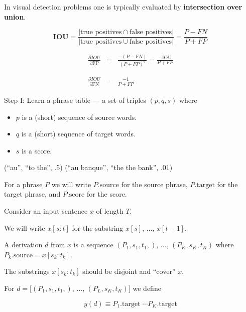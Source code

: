 {

In visual detection problems one is typically evaluated by {\bf intersection over union}.

$$\mathbf{IOU} = \frac{|\mbox{true positives} \cap \mbox{false positives}|}{|\mbox{true positives} \cup\mbox{false positives}|} = \frac{P - FN}{P + FP}$$

\vfill
\begin{eqnarray*}
    \frac{\partial \mathrm{}IOU}{\partial \mathrm{FP}} & =  & \frac{-(P - FN)}{(P + FP)^2} = \frac{-\mathrm{IOU}}{P+ FP} \\
    \\ \\
    \frac{\partial \mathrm{}IOU}{\partial \mathrm{FN}} & =  & \frac{-1}{P + FP}
\end{eqnarray*}


Step I:   Learn a phrase table --- a set of triples $(p,q,s)$ where

\vfill
\begin{itemize}
\item $p$ is a (short) sequence of source words.
  \vfill
\item $q$ is a (short) sequence of target words.
  \vfill
\item $s$ is a score.
\end{itemize}

\vfill
(``au'', ``to the'', .5) \hfill (``au banque'', ``the the bank'', .01)

\vfill
For a phrase $P$ we will write $P.\mathrm{source}$ for the source phrase, $P.\mathrm{target}$ for the target phrase, and $P.\mathrm{score}$ for the score.


Consider an input sentence $x$ of length $T$.

\vfill
We will write $x[s:t]$ for the substring $x[s]$, $\ldots$, $x[t-1]$.

\vfill
A derivation $d$ from $x$ is a sequence $(P_1,s_1,t_1,)$, $\ldots$, $(P_K,s_K,t_K)$ where $P_k.\mathrm{source} = x[s_k:t_k]$.

\vfill
The substrings $x[s_k:t_k]$ should be disjoint and ``cover'' $x$.

\vfill
For $d = [(P_1,s_1,t_1,)$, $\ldots$, $(P_L,s_K,t_K)]$ we define

$$ y(d) \equiv P_1.\mathrm{target}\;\cdots P_K.\mathrm{target}$$

}
